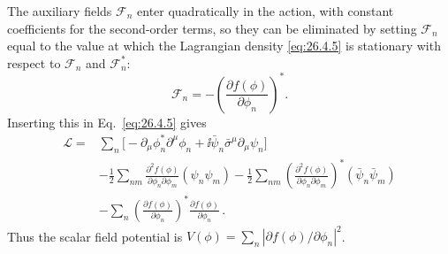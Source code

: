 The auxiliary fields \(\mathcal{F}_n\) enter quadratically in the action, with
constant coefficients for the second-order terms, so they can be eliminated
by setting \(\mathcal{F}_n\) equal to the value at which the Lagrangian density
\eqref{eq:26.4.5} is stationary with respect to \(\mathcal{F}_n\) and
\(\mathcal{F}_n^*\):
\begin{equation}
  \mathcal{F}_n=-\left(\frac{\partial f(\phi)}{\partial\phi_n}\right)^* .
  \tag{26.4.6}\label{eq:26.4.6}
\end{equation}
Inserting this in Eq.~\eqref{eq:26.4.5} gives
\begin{equation}
  \begin{aligned}
  \mathcal{L}={}&
  \sum_n\biggl[
    -\partial_\mu\phi_n^*\partial^\mu\phi_n
    +\ii\bar\psi_n\bar\sigma^\mu\partial_\mu\psi_n
  \biggr]
  \\
  &-\frac12\sum_{nm}
    \frac{\partial^2f(\phi)}{\partial\phi_n\partial\phi_m}
    (\psi_n\psi_m)
  -\frac12\sum_{nm}
    \left(\frac{\partial^2f(\phi)}
      {\partial\phi_n\partial\phi_m}\right)^*
    (\bar\psi_n\bar\psi_m)
  \\
  &-\sum_n
    \left(\frac{\partial f(\phi)}{\partial\phi_n}\right)^*
    \frac{\partial f(\phi)}{\partial\phi_n}\,.
  \end{aligned}
  \tag{26.4.7}\label{eq:26.4.7}
\end{equation}
Thus the scalar field potential is
\(V(\phi)=\sum_n|\partial f(\phi)/\partial\phi_n|^2\).

